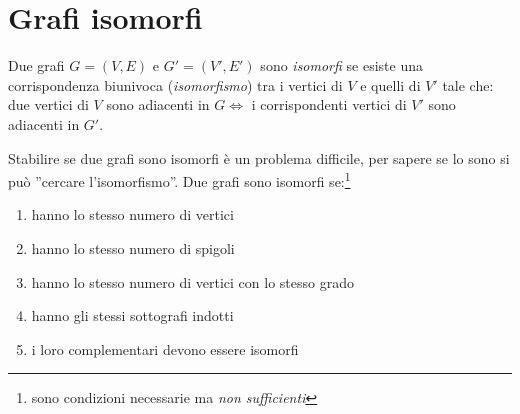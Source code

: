 \section{Grafi isomorfi}
\begin{defn}
Due grafi $G=(V,E)$ e $G'=(V',E')$ sono \emph{isomorfi} se esiste una corrispondenza biunivoca
(\emph{isomorfismo}) tra i vertici di $V$ e quelli di $V'$ tale che: due vertici di $V$ sono
adiacenti in $G \iff $ i corrispondenti vertici di $V'$ sono adiacenti in $G'$. 
\end{defn}
Stabilire se due grafi sono isomorfi è un problema difficile, per 
sapere se lo sono si può ''cercare l'isomorfismo''.
Due grafi sono isomorfi se:\footnote{sono condizioni necessarie ma \emph{non sufficienti}}
\begin{enumerate}
    \item hanno lo stesso numero di vertici
    \item hanno lo stesso numero di spigoli
    \item hanno lo stesso numero di vertici con lo stesso grado
    \item hanno gli stessi sottografi indotti
    \item i loro complementari devono essere isomorfi
\end{enumerate}

